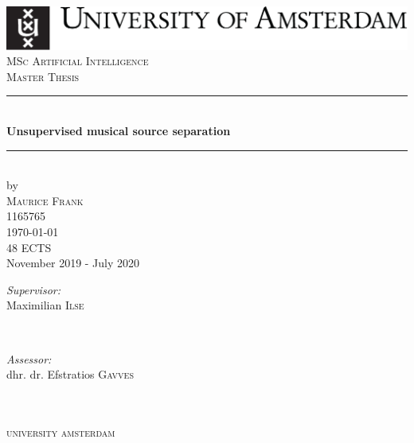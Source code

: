 \begin{titlepage}
\begin{fullwidth}
\newcommand{\HRule}{\rule{\linewidth}{0.5mm}} %

\center %
\includegraphics[width=0.8\linewidth]{../data/images/uva_logo}\\[2.5cm]

\textsc{\Large MSc Artificial Intelligence}\\[0.2cm]
\textsc{\Large Master Thesis}\\[0.5cm]

\HRule \\[0.4cm]
{ \huge \bfseries Unsupervised musical source separation}\\[0.4cm] %
\HRule \\[0.5cm]


by\\[0.2cm]
\textsc{\Large Maurice Frank}\\[0.2cm]
1165765\\[1cm]

{\Large \today}\\[1cm]
48 ECTS\\ %

November 2019 - July 2020\\[1cm]%

\begin{minipage}[t]{0.4\textwidth}
\begin{flushleft} \large
\emph{Supervisor:} \\
Maximilian \textsc{Ilse}
\end{flushleft}
\end{minipage}
~
\begin{minipage}[t]{0.4\textwidth}
\begin{flushright} \large
\emph{Assessor:} \\
dhr. dr. Efstratios \textsc{Gavves}\\
\end{flushright}
\end{minipage}\\[2cm]


\framebox{\rule{0pt}{2.5cm}\rule{2.5cm}{0pt}}\\[0.5cm]
\textsc{\large university amsterdam}\\[1.0cm] %
\vfill %
\end{fullwidth}
\end{titlepage}
